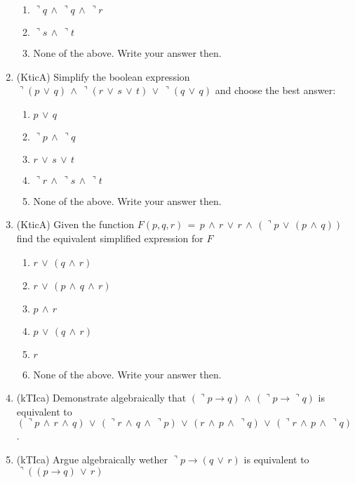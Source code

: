 \documentclass{article}
\begin{document}
\begin{enumerate}
\begin{enumerate}
\item $\urcorner q\,\wedge\,\urcorner q\,\wedge\,\urcorner r$
\item $\urcorner s\,\wedge\, \urcorner t$
\item None of the above. Write your answer then.
\end{enumerate}
\item (KticA) Simplify the boolean expression $\urcorner (p\,\vee\,q)\,\wedge\,\urcorner (r\,\vee\,s\,\vee\,t)\,\vee\,\urcorner (q\,\vee\,q)$
and choose the best answer:
\begin{enumerate}
\item $p\,\vee\,q$
\item $\urcorner p\,\wedge\,\urcorner q$
\item $r\,\vee\,s\,\vee\,t$
\item $\urcorner r\,\wedge\,\urcorner s\,\wedge\, \urcorner t$
\item None of the above. Write your answer then.
\end{enumerate}
\item (KticA) Given the function $F(p,q,r)\,=\,p\,\wedge\,r\,\vee\,r\,\wedge\,(\urcorner p\,\vee\,(p\,\wedge\,q))$ find the equivalent simplified 
expression for $F$
\begin{enumerate}
\item $r\,\vee\,(q\,\wedge\,r)$
\item $r\,\vee\,(p\,\wedge\,q\,\wedge\,r)$
\item $p\,\wedge\,r$
\item $p\,\vee\,(q\,\wedge\,r)$
\item $r$
\item None of the above. Write your answer then.
\end{enumerate}
\item (kTIca) Demonstrate algebraically that $(\urcorner p\rightarrow q)\,\wedge\,(\urcorner p \rightarrow \urcorner q)$ is equivalent to 
$(\urcorner p\,\wedge\, r\,\wedge\, q)\,\vee\,(\urcorner r\,\wedge\, q\,\wedge\,\urcorner p)\,\vee\,(r\,\wedge\, p\,\wedge\, \urcorner q)\,\vee\,(\urcorner r\,\wedge\, p\,\wedge\,\urcorner q)$.
\item (kTIca) Argue algebraically wether $\urcorner p \rightarrow (q\,\vee\,r)$ is equivalent to $\urcorner ((p\rightarrow q)\,\vee\,r)$
\end{enumerate}
\end{document}
